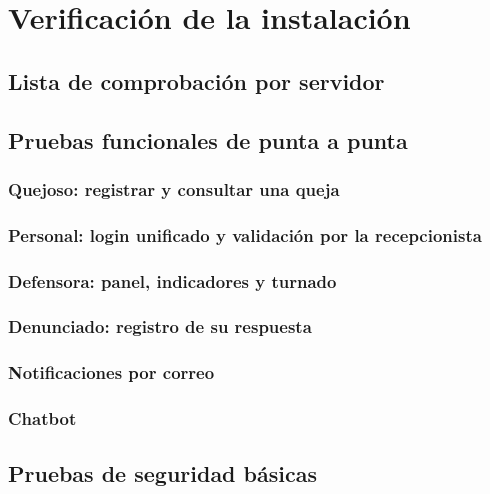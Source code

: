 \section{Verificación de la instalación}

\subsection{Lista de comprobación por servidor}

\subsection{Pruebas funcionales de punta a punta}
\subsubsection{Quejoso: registrar y consultar una queja}
\subsubsection{Personal: login unificado y validación por la recepcionista}
\subsubsection{Defensora: panel, indicadores y turnado}
\subsubsection{Denunciado: registro de su respuesta}
\subsubsection{Notificaciones por correo}
\subsubsection{Chatbot}

\subsection{Pruebas de seguridad básicas}
